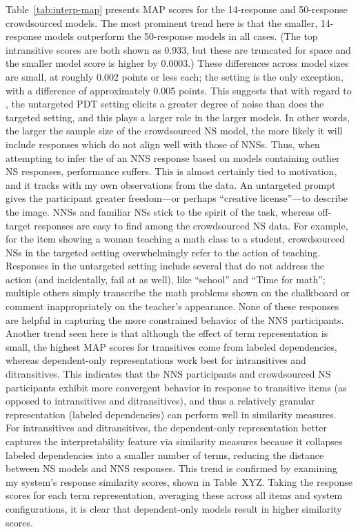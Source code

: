 Table~\ref{tab:interp-map} presents  MAP scores for the 14-response and 50-response crowdsourced models. The most prominent trend here is that the smaller, 14-response models outperform the 50-response models in all cases. (The top intransitive scores are both shown as 0.933, but these are truncated for space and the smaller model score is higher by 0.0003.) These differences across model sizes are small, at roughly 0.002 points or less each; the  setting is the only exception, with a difference of approximately 0.005 points. This suggests that with regard to , the untargeted PDT setting elicits a greater degree of noise than does the targeted setting, and this plays a larger role in the larger models. In other words, the larger the sample size of the crowdsourced NS model, the more likely it will include responses which do not align well with those of NNSs. Thus, when attempting to infer the  of an NNS response based on models containing outlier NS responses, performance suffers. This is almost certainly tied to motivation, and it tracks with my own observations from the data. An untargeted prompt gives the participant greater freedom---or perhaps ``creative license''---to describe the image. NNSs and familiar NSs  stick to the spirit of the task, whereas off-target responses are easy to find among the crowdsourced NS data. For example, for the item showing a woman teaching a math class to a student, crowdsourced NSs in the targeted setting overwhelmingly refer to the action of teaching. Responses in the untargeted setting include several that do not address the action (and incidentally, fail at  as well), like ``school'' and ``Time for math''; multiple others simply transcribe the math problems shown on the chalkboard or comment inappropriately on the teacher's appearance. None of these responses are helpful in capturing the more constrained behavior of the NNS participants.
Another trend seen here is that although the effect of term representation is small, the highest MAP scores for transitives come from labeled dependencies, whereas dependent-only representations work best for intransitives and ditransitives. This indicates that the NNS participants and crowdsourced NS participants exhibit more convergent behavior in response to transitive items (as opposed to intransitives and ditransitives), and thus a relatively granular representation (labeled dependencies) can perform well in similarity measures. For intransitives and ditransitives, the dependent-only representation better captures the interpretability feature via similarity measures because it collapses labeled dependencies into a smaller number of terms, reducing the distance between NS models and NNS responses. This trend is confirmed by examining my system's response similarity scores, shown in Table~XYZ. Taking the response scores for each term representation, averaging these across all items and system configurations, it is clear that dependent-only models result in higher similarity scores.

